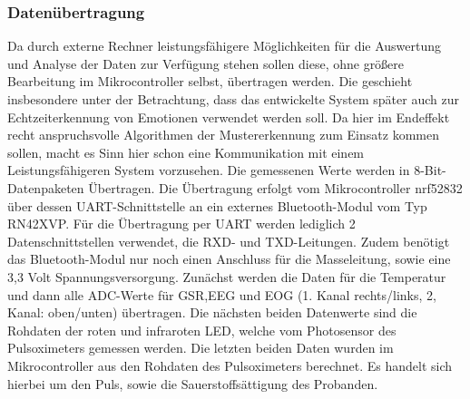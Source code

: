 \subsubsection{Daten{\"u}bertragung} \label{datenuebertragung-1}

Da durch externe Rechner leistungsfähigere Möglichkeiten für die Auswertung und Analyse der Daten zur Verfügung stehen sollen diese, ohne größere Bearbeitung im Mikrocontroller selbst, übertragen werden.
Die geschieht insbesondere unter der Betrachtung, dass das entwickelte System später auch zur Echtzeiterkennung von Emotionen verwendet werden soll. 
Da hier im Endeffekt recht anspruchsvolle Algorithmen der Mustererkennung zum Einsatz kommen sollen, macht es Sinn hier schon eine Kommunikation mit einem Leistungsfähigeren System vorzusehen.
Die gemessenen Werte werden in 8-Bit-Datenpaketen Übertragen. Die Übertragung erfolgt vom Mikrocontroller nrf52832 über dessen UART-Schnittstelle an ein externes Bluetooth-Modul vom Typ RN42XVP. 
Für die Übertragung per UART werden lediglich 2 Datenschnittstellen verwendet, die RXD- und TXD-Leitungen.
Zudem benötigt das Bluetooth-Modul nur noch einen Anschluss für die Masseleitung, sowie eine 3,3 Volt Spannungsversorgung. 
Zunächst werden die Daten für die Temperatur und dann alle ADC-Werte für GSR,EEG und EOG (1. Kanal rechts/links, 2, Kanal: oben/unten) übertragen.  
Die nächsten beiden Datenwerte sind die Rohdaten der roten und infraroten LED, welche vom Photosensor des Pulsoximeters gemessen werden. 
Die letzten beiden Daten wurden im Mikrocontroller aus den Rohdaten des Pulsoximeters berechnet. Es handelt sich hierbei um den Puls, sowie die Sauerstoffsättigung des Probanden.

